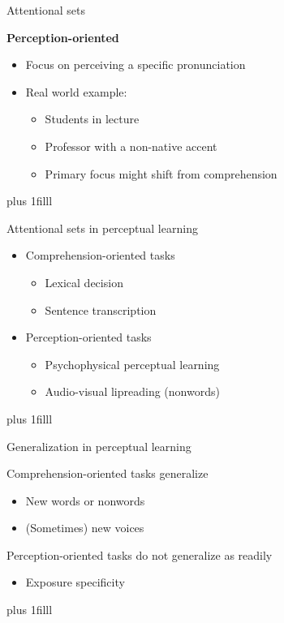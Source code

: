 \documentclass{beamer}
\newcommand{\btVFill}{\vskip0pt plus 1filll}
\begin{document}
\begin{frame}{Attentional sets}

\textbf{Perception-oriented}
\begin{itemize}
\item Focus on perceiving a specific pronunciation
\item Real world example:
\begin{itemize}
\item Students in lecture
\item Professor with a non-native accent
\item Primary focus might shift from comprehension
\end{itemize}
\end{itemize}
\btVFill
\begin{flushright}
\scriptsize
\citet{Pitt2012}
\end{flushright}
\end{frame}

\begin{frame}{Attentional sets in perceptual learning}

\begin{itemize}
\item Comprehension-oriented tasks
\begin{itemize}
\item Lexical decision
\item Sentence transcription
\end{itemize}
\item Perception-oriented tasks
\begin{itemize}
\item Psychophysical perceptual learning
\item Audio-visual lipreading (nonwords)
\end{itemize}
\end{itemize}

\btVFill
\begin{flushright}
\scriptsize
\citet{Ahissar1993,Norris2003,Vroomen2007, Bradlow2008,Reinisch2014}
\end{flushright}

\end{frame}

\begin{frame}{Generalization in perceptual learning}

 Comprehension-oriented tasks generalize
\begin{itemize}
\item New words or nonwords
\item (Sometimes) new voices
\end{itemize}
Perception-oriented tasks do not generalize as readily
\begin{itemize}
\item Exposure specificity
\end{itemize}
\btVFill
\begin{flushright}
\scriptsize
\citet{Ahissar1993, Norris2003, Kraljic2005, Bradlow2008, Pitt2012, Reinisch2013}
\end{flushright}

\end{frame}
\end{document}
